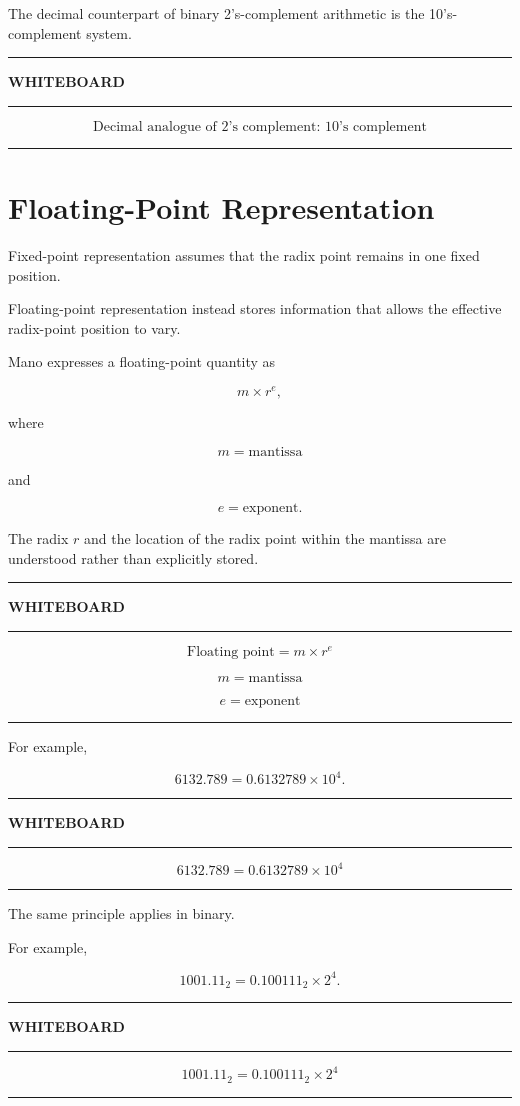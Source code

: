 \documentclass[11pt]{article}
\newenvironment{whiteboard}
{
    \par\medskip
    \begin{center}
    \begin{minipage}{0.94\textwidth}
    \hrule
    \vspace{0.4em}
    \textbf{\large WHITEBOARD}
    \vspace{0.3em}
    \hrule
    \vspace{0.7em}
}
{
    \vspace{0.5em}
    \hrule
    \end{minipage}
    \end{center}
    \medskip
}
\begin{document}
The decimal counterpart of binary 2's-complement arithmetic is the
10's-complement system.

\begin{whiteboard}
\[
\boxed{\text{Decimal analogue of 2's complement: 10's complement}}
\]
\end{whiteboard}

\section{Floating-Point Representation}

Fixed-point representation assumes that the radix point remains in one fixed
position.

Floating-point representation instead stores information that allows the
effective radix-point position to vary.

Mano expresses a floating-point quantity as

\[
m\times r^e,
\]

where

\[
m=\text{mantissa}
\]

and

\[
e=\text{exponent}.
\]

The radix \(r\) and the location of the radix point within the mantissa are
understood rather than explicitly stored.

\begin{whiteboard}
\[
\boxed{\text{Floating point}=m\times r^e}
\]

\[
m=\text{mantissa}
\]

\[
e=\text{exponent}
\]
\end{whiteboard}

For example,

\[
6132.789
=
0.6132789\times10^4.
\]

\begin{whiteboard}
\[
6132.789
=
0.6132789\times10^4
\]
\end{whiteboard}

The same principle applies in binary.

For example,

\[
1001.11_2
=
0.100111_2\times2^4.
\]

\begin{whiteboard}
\[
1001.11_2
=
0.100111_2\times2^4
\]
\end{whiteboard}
\end{document}
